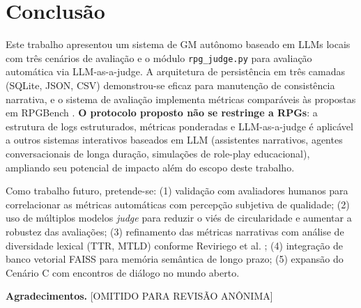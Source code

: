\documentclass[12pt]{article}
\begin{document}
\section{Conclusão}

Este trabalho apresentou um sistema de GM autônomo baseado em LLMs locais com três cenários de avaliação e o módulo \texttt{rpg\_judge.py} para avaliação automática via LLM-as-a-judge. A arquitetura de persistência em três camadas (SQLite, JSON, CSV) demonstrou-se eficaz para manutenção de consistência narrativa, e o sistema de avaliação implementa métricas comparáveis às propostas em RPGBench \cite{yu:2025}. \textbf{O protocolo proposto não se restringe a RPGs}: a estrutura de logs estruturados, métricas ponderadas e LLM-as-a-judge é aplicável a outros sistemas interativos baseados em LLM (assistentes narrativos, agentes conversacionais de longa duração, simulações de role-play educacional), ampliando seu potencial de impacto além do escopo deste trabalho.

Como trabalho futuro, pretende-se: (1) validação com avaliadores humanos para correlacionar as métricas automáticas com percepção subjetiva de qualidade; (2) uso de múltiplos modelos \textit{judge} para reduzir o viés de circularidade e aumentar a robustez das avaliações; (3) refinamento das métricas narrativas com análise de diversidade lexical (TTR, MTLD) conforme Reviriego et al. \cite{reviriego:2024}; (4) integração de banco vetorial FAISS para memória semântica de longo prazo; (5) expansão do Cenário C com encontros de diálogo no mundo aberto.

\textbf{Agradecimentos.} [OMITIDO PARA REVISÃO ANÔNIMA]



\end{document}
